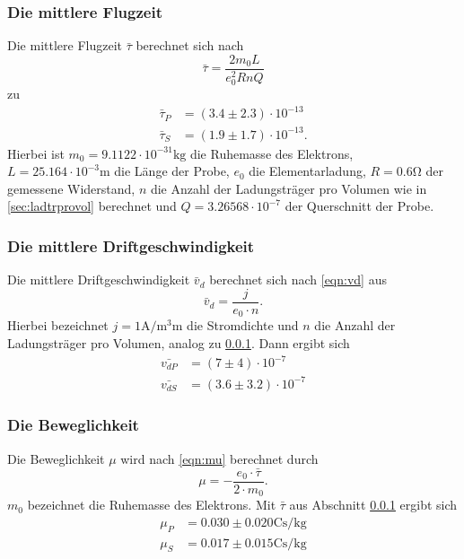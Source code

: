     \subsubsection{Die mittlere Flugzeit}
    \label{sec:mitflugz}
      Die mittlere Flugzeit $\bar{\tau}$ berechnet sich nach
      \begin{equation*}
        \bar{\tau} = \frac{2m_{0}L}{e_{0}^{2}RnQ}
      \end{equation*}
      zu
      \begin{align*}
        \bar{\tau}_{P} & = (3.4 \pm 2.3) \cdot 10^{-13} \\
        \bar{\tau}_{S} & = (1.9 \pm 1.7) \cdot 10^{-13}.
      \end{align*}
      Hierbei ist $m_{0} = 9.1122 \cdot 10^{-31} \si{\kilo\gram}$ die Ruhemasse des Elektrons, $L = 25.164 \cdot 10^{-3} \si{\meter}$ die Länge der Probe,
      $e_{0}$ die Elementarladung, $R = 0.6 \si{\ohm}$ der gemessene Widerstand, $n$ die Anzahl der Ladungsträger pro Volumen wie in \ref{sec:ladtrprovol} berechnet
      und $Q = 3.26568 \cdot 10^{-7}$ der Querschnitt der Probe.
    \subsubsection{Die mittlere Driftgeschwindigkeit}
      Die mittlere Driftgeschwindigkeit $\bar{v}_d$ berechnet sich nach \ref{eqn:vd} aus
      \begin{equation}
        \bar{v}_d = \frac{j}{e_{0} \cdot n}.
      \end{equation}
      Hierbei bezeichnet $j = 1 \si{\ampere\per\cubic\milli\meter}$ die Stromdichte und $n$ die Anzahl der Ladungsträger pro Volumen, analog zu \ref{sec:mitflugz}.
      Dann ergibt sich
      \begin{align*}
        \bar{v_{dP}} & = (7 \pm 4) \cdot 10^{-7} \\
        \bar{v_{dS}} & = (3.6 \pm 3.2) \cdot 10^{-7}
      \end{align*}
    \subsubsection{Die Beweglichkeit}
      Die Beweglichkeit $\mu$ wird nach \ref{eqn:mu} berechnet durch
      \begin{equation}
        \mu = -\frac{e_{0} \cdot \bar{\tau}}{2 \cdot m_{0}}.
      \end{equation}
      $m_{0}$ bezeichnet die Ruhemasse des Elektrons. Mit $\bar{\tau}$ aus Abschnitt \ref{sec:mitflugz} ergibt sich
      \begin{align*}
        \mu_{P} & = 0.030 \pm 0.020 \si{\coulomb\second\per\kilo\gram}\\
        \mu_{S} & = 0.017 \pm 0.015 \si{\coulomb\second\per\kilo\gram}
      \end{align*}
